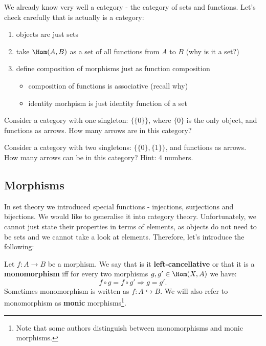 \begin{example}
  We already know very well a category - the category of sets and functions. Let's check carefully that is actually is a category:
  \begin{enumerate}
    \item objects are just sets
    \item take $\Hom(A,B)$ as a set of all functions from $A$ to $B$ (why is it a set?)
    \item define composition of morphisms just as function composition
      \begin{itemize}
        \item composition of functions is associative (recall why)
        \item identity morhpism is just identity function of a set
      \end{itemize}
  \end{enumerate}
\end{example}

\begin{exercise}
  Consider a category with one singleton: $\{\{0\}\}$, where $\{0\}$ is the only object, and functions as arrows. How many arrows are in this category?
\end{exercise}

\begin{exercise}
  Consider a category with two singletons: $\{\{0\}, \{1\}\}$, and functions as arrows. How many arrows can be in this category? Hint: 4 numbers.
\end{exercise}

\subsection{Morphisms}
In set theory we introduced special functions - injections, surjections and bijections. We would like to generalise it into category theory. Unfortunately, we cannot just state their properties in terms of elements, as objects do not need to be sets and we cannot take a look at elements. Therefore, let's introduce the following:

\begin{definition}
  Let $f: A\to B$ be a morphism. We say that is it \textbf{left-cancellative} or that it is a \textbf{monomorphism} iff for every two morphisms $g,g' \in \Hom(X,A)$ we have:
  $$f\circ g = f\circ g'\Rightarrow g=g'.$$
  Sometimes monomorphism is written as $f: A\hookrightarrow B$. We will also refer to monomorphism as \textbf{monic} morphisms\footnote{Note that some authors distinguish between monomorphisms and monic
  morphisms.}.
\end{definition}

